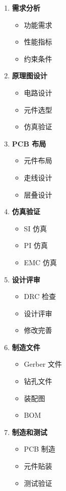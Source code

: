 \begin{enumerate}
  \item \textbf{需求分析}
    \begin{itemize}
      \item 功能需求
      \item 性能指标
      \item 约束条件
    \end{itemize}

  \item \textbf{原理图设计}
    \begin{itemize}
      \item 电路设计
      \item 元件选型
      \item 仿真验证
    \end{itemize}

  \item \textbf{PCB 布局}
    \begin{itemize}
      \item 元件布局
      \item 走线设计
      \item 层叠设计
    \end{itemize}

  \item \textbf{仿真验证}
    \begin{itemize}
      \item SI 仿真
      \item PI 仿真
      \item EMC 仿真
    \end{itemize}

  \item \textbf{设计评审}
    \begin{itemize}
      \item DRC 检查
      \item 设计评审
      \item 修改完善
    \end{itemize}

  \item \textbf{制造文件}
    \begin{itemize}
      \item Gerber 文件
      \item 钻孔文件
      \item 装配图
      \item BOM
    \end{itemize}

  \item \textbf{制造和测试}
    \begin{itemize}
      \item PCB 制造
      \item 元件贴装
      \item 测试验证
    \end{itemize}
\end{enumerate}

